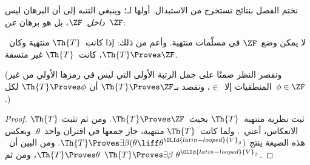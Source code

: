 \documentclass[../../../include/open-logic-section]{subfiles}
\begin{document}
	
نختم الفصل بنتائج تستخرج من الاستبدال. أولها لـ\citet{Montague1961}؛
وينبغي التنبه إلى أن البرهان ليس \emph{داخل}~$\ZF$، بل هو برهان
\emph{عن}~$\ZF$:
\begin{thm}
	لا يمكن وضع~$\ZF$ في مسلّمات منتهية. وأعم من ذلك: إذا كانت~$\Th{T}$
	منتهية وكان~$\Th{T} \Proves \ZF$، كانت~$\Th{T}$ غير متسقة.
	
	(ونقصر النظر ضمنًا على جمل الرتبة الأولى التي ليس في رمزها الأولي
	من غير المنطقيات إلا~$\in$، ونقصد بـ$\Th{T} \Proves \ZF$ أن
	$\Th{T} \Proves \phi$ لكل~$\phi \in \ZF$.)
\end{thm}
\begin{proof}
	ثبت نظرية منتهية~$\Th{T}$ بحيث~$\Th{T} \Proves \ZF$. ومن ثم تثبت
	$\Th{T}$ الانعكاس، أعني~.
	ولما كانت~$\Th{T}$ منتهية، جاز جمعها في اقتران واحد~$\theta$.
	وبعكس هذه الصيغة ينتج
	$\Th{T} \Proves \exists \beta(\theta \liff \theta^{{\OLId{latin-looped}{V}}_\beta})$.
	ومن البين أن~$\Th{T} \Proves \theta$، ومن ثم
	$\Th{T} \Proves \exists \beta\ \theta^{{\OLId{latin-looped}{V}}_\beta}$.
	

\end{proof}
\end{document}
